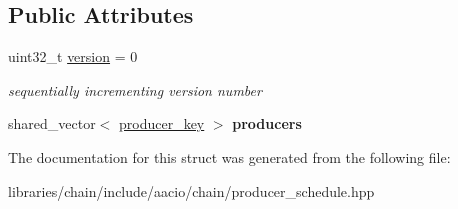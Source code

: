 \subsection*{Public Attributes}
\begin{DoxyCompactItemize}
\item 
\mbox{\label{structaacio_1_1chain_1_1shared__producer__schedule__type_a7e409a5bbfd551ed61882596be4b58f4}} 
uint32\+\_\+t \mbox{\hyperlink{structaacio_1_1chain_1_1shared__producer__schedule__type_a7e409a5bbfd551ed61882596be4b58f4}{version}} = 0
\begin{DoxyCompactList}\small\item\em sequentially incrementing version number \end{DoxyCompactList}\item 
\mbox{\label{structaacio_1_1chain_1_1shared__producer__schedule__type_ac01dd5f738343ee54a045e55a0ab0aa4}} 
shared\+\_\+vector$<$ \mbox{\hyperlink{structaacio_1_1chain_1_1producer__key}{producer\+\_\+key}} $>$ {\bfseries producers}
\end{DoxyCompactItemize}


The documentation for this struct was generated from the following file\+:\begin{DoxyCompactItemize}
\item 
libraries/chain/include/aacio/chain/producer\+\_\+schedule.\+hpp\end{DoxyCompactItemize}
